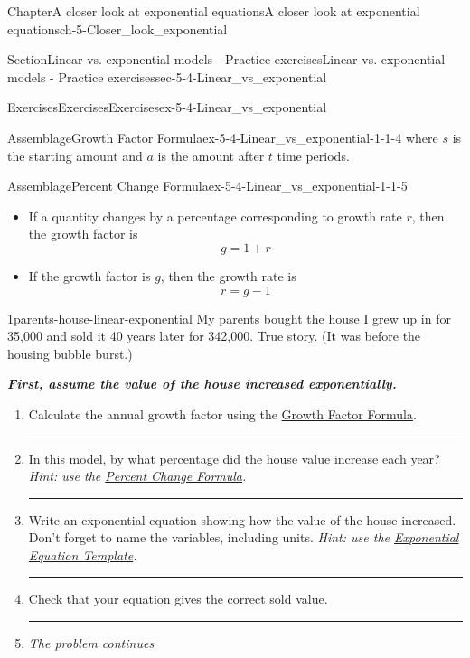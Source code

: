 \documentclass[twoside,11pt,]{book}
\newcommand{\alert}[1]{\textbf{\textit{#1}}}
\newlength{\workspacestrutwidth}
\numberwithin{equation}{section}
\begin{document}
\begin{chapterptx}{Chapter}{A closer look at exponential equations}{}{A closer look at exponential equations}{}{}{ch-5-Closer_look_exponential}
\begin{sectionptx}{Section}{Linear vs. exponential models - Practice exercises}{}{Linear vs. exponential models - Practice exercises}{}{}{sec-5-4-Linear_vs_exponential}
\begin{exercises-subsection-numberless}{Exercises}{Exercises}{}{Exercises}{}{}{ex-5-4-Linear_vs_exponential}
\begin{assemblage}{Assemblage}{Growth Factor Formula}{ex-5-4-Linear_vs_exponential-1-1-4}
where \(s\) is the starting amount and \(a\) is the amount after \(t\) time periods.%
\end{assemblage}
 \begin{assemblage}{Assemblage}{Percent Change Formula}{ex-5-4-Linear_vs_exponential-1-1-5}%
%
\begin{itemize}[label=\textbullet]
\item{}If a quantity changes by a percentage corresponding to growth rate \(r\), then the growth factor is%
\begin{equation*}
\displaystyle g=1+r
\end{equation*}
%
\item{}If the growth factor is \(g\), then the growth rate is%
\begin{equation*}
r = g-1
\end{equation*}
%
\end{itemize}
%
\end{assemblage}
\clearpage
\begin{divisionexercise}{1}{}{}{parents-house-linear-exponential}%
My parents bought the house I grew up in for \textdollar{}35,000 and sold it 40 years later for \textdollar{}342,000. True story. (It was before the housing bubble burst.)%
 \par
\alert{First, assume the value of the house increased exponentially.}%
\begin{enumerate}[label=(\alph*),ref=\alph*]%
\item{}Calculate the annual growth factor using the \hyperref[growth-factor-formula]{Growth Factor Formula}.%
\par\rule{\workspacestrutwidth}{1.75in}%
\item{}In this model, by what percentage did the house value increase each year? \emph{Hint: use the \hyperref[percent-change-formula]{Percent Change Formula}.}%
\par\rule{\workspacestrutwidth}{0.75in}%
\item{}Write an exponential equation showing how the value of the house increased. Don't forget to name the variables, including units. \emph{Hint: use the \hyperref[exp-eqn-template]{Exponential Equation Template}.}%
\par\rule{\workspacestrutwidth}{2.5in}%
\item{}Check that your equation gives the correct sold value.%
\par\rule{\workspacestrutwidth}{0.5in}%
\item{}\emph{The problem continues \textellipsis{}}%
\par

\end{enumerate}
\end{divisionexercise}
\end{exercises-subsection-numberless}
\end{sectionptx}
\end{chapterptx}
\end{document}
